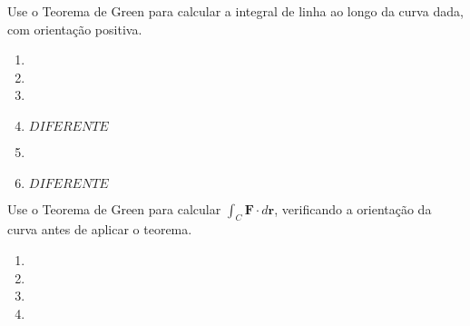 



	
	
	\vspace{5mm}
	
	Use o Teorema de Green para calcular a integral de linha ao longo da curva dada, com orientação positiva.
	
	\begin{enumerate}
		
		\item
		\resposta{}

		\item
		\resposta{}

		\item
		\resposta{}

		\item $DIFERENTE$

		\item
		\resposta{}

		\item $DIFERENTE$
		
	\end{enumerate}
	
	\vspace{5mm}
	
	Use o Teorema de Green para calcular $\displaystyle \int_C \textbf{F} \cdot d\textbf{r}$, verificando a orientação da curva antes de aplicar o teorema.
	
	\begin{enumerate}[resume]

		\item
		\resposta{}

		\item
		\resposta{}

		\item
		\resposta{}

		\item
		\resposta{}
	
	\end{enumerate}
		
	\vspace{5mm}	
	
	


